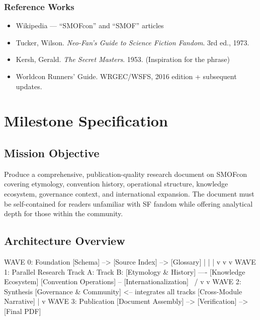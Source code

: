 \documentclass[11pt,letterpaper]{article}
\newcommand{\stageheader}[2]{%
  \noindent\colorbox{#2}{\makebox[\textwidth][l]{%
    \textcolor{white}{\bfseries\sffamily\hspace{6pt}#1\hspace{6pt}}}}%
  \vspace{0.5em}\par%
}
\begin{document}
\subsubsection{Reference Works}

\begin{itemize}[leftmargin=2em]
\item Wikipedia --- ``SMOFcon'' and ``SMOF'' articles
\item Tucker, Wilson. \textit{Neo-Fan's Guide to Science Fiction Fandom}. 3rd ed., 1973.
\item Kersh, Gerald. \textit{The Secret Masters}. 1953. (Inspiration for the phrase)
\item Worldcon Runners' Guide. WRGEC/WSFS, 2016 edition + subsequent updates.
\end{itemize}

\newpage

\stageheader{STAGE 3 --- MISSION PACKAGE}{tertiary}

\section{Milestone Specification}

\subsection{Mission Objective}

Produce a comprehensive, publication-quality research document on SMOFcon covering etymology, convention history, operational structure, knowledge ecosystem, governance context, and international expansion. The document must be self-contained for readers unfamiliar with SF fandom while offering analytical depth for those within the community.

\subsection{Architecture Overview}

\begin{asciibox}
  WAVE 0: Foundation
  [Schema] --> [Source Index] --> [Glossary]
       |             |               |
       v             v               v
  WAVE 1: Parallel Research
  Track A:                    Track B:
  [Etymology & History] ---- [Knowledge Ecosystem]
  [Convention Operations] -- [Internationalization]
                \               /
                 v             v
  WAVE 2: Synthesis
  [Governance & Community] <-- integrates all tracks
  [Cross-Module Narrative]
       |
       v
  WAVE 3: Publication
  [Document Assembly] --> [Verification] --> [Final PDF]
\end{asciibox}
\end{document}
